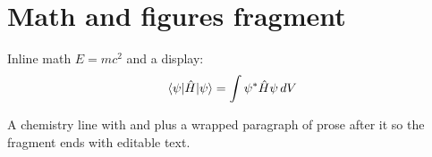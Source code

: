 \section{Math and figures fragment}

Inline math $E = mc^2$ and a display:
\begin{equation}
	\braket{\psi | \hat{H} | \psi} = \int \psi^* \hat{H} \psi \, dV
\end{equation}

A chemistry line with  and  plus a wrapped paragraph of prose after
it so the fragment ends with editable text.

